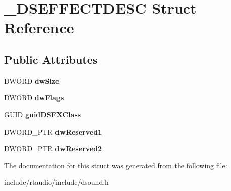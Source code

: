 \hypertarget{struct___d_s_e_f_f_e_c_t_d_e_s_c}{}\section{\+\_\+\+D\+S\+E\+F\+F\+E\+C\+T\+D\+E\+SC Struct Reference}
\label{struct___d_s_e_f_f_e_c_t_d_e_s_c}
\subsection*{Public Attributes}
\begin{DoxyCompactItemize}
\item 
D\+W\+O\+RD {\bfseries dw\+Size}\hypertarget{struct___d_s_e_f_f_e_c_t_d_e_s_c_ac2b441da964910f1c1a026e6800edb73}{}\label{struct___d_s_e_f_f_e_c_t_d_e_s_c_ac2b441da964910f1c1a026e6800edb73}

\item 
D\+W\+O\+RD {\bfseries dw\+Flags}\hypertarget{struct___d_s_e_f_f_e_c_t_d_e_s_c_a15978730bee43cc2e166b434a416732a}{}\label{struct___d_s_e_f_f_e_c_t_d_e_s_c_a15978730bee43cc2e166b434a416732a}

\item 
G\+U\+ID {\bfseries guid\+D\+S\+F\+X\+Class}\hypertarget{struct___d_s_e_f_f_e_c_t_d_e_s_c_aea8712bc27e12d028b271b4d8c9b9069}{}\label{struct___d_s_e_f_f_e_c_t_d_e_s_c_aea8712bc27e12d028b271b4d8c9b9069}

\item 
D\+W\+O\+R\+D\+\_\+\+P\+TR {\bfseries dw\+Reserved1}\hypertarget{struct___d_s_e_f_f_e_c_t_d_e_s_c_a86663c2fb04e2fcf28ebc698a2d450c6}{}\label{struct___d_s_e_f_f_e_c_t_d_e_s_c_a86663c2fb04e2fcf28ebc698a2d450c6}

\item 
D\+W\+O\+R\+D\+\_\+\+P\+TR {\bfseries dw\+Reserved2}\hypertarget{struct___d_s_e_f_f_e_c_t_d_e_s_c_a3c8b02cfbb975e8f867b89797b035afb}{}\label{struct___d_s_e_f_f_e_c_t_d_e_s_c_a3c8b02cfbb975e8f867b89797b035afb}

\end{DoxyCompactItemize}


The documentation for this struct was generated from the following file\+:\begin{DoxyCompactItemize}
\item 
include/rtaudio/include/dsound.\+h\end{DoxyCompactItemize}
